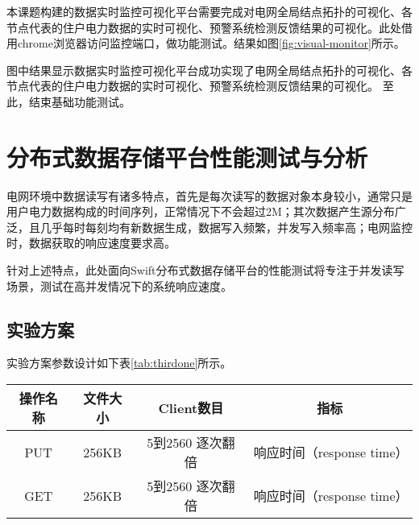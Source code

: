 本课题构建的数据实时监控可视化平台需要完成对电网全局结点拓扑的可视化、各节点代表的住户电力数据的实时可视化、预警系统检测反馈结果的可视化。此处借用chrome浏览器访问监控端口，做功能测试。结果如图\ref{fig:visual-monitor}所示。

\begin{figure}[!htp]
  \centering
  \hspace{1in}
  \hspace{1in}
  \hspace{1in}
\end{figure}

图中结果显示数据实时监控可视化平台成功实现了电网全局结点拓扑的可视化、各节点代表的住户电力数据的实时可视化、预警系统检测反馈结果的可视化。
至此，结束基础功能测试。

\section{分布式数据存储平台性能测试与分析}

电网环境中数据读写有诸多特点，首先是每次读写的数据对象本身较小，通常只是用户电力数据构成的时间序列，正常情况下不会超过2M；其次数据产生源分布广泛，且几乎每时每刻均有新数据生成，数据写入频繁，并发写入频率高；电网监控时，数据获取的响应速度要求高。

针对上述特点，此处面向Swift分布式数据存储平台的性能测试将专注于并发读写场景，测试在高并发情况下的系统响应速度。

\subsection{实验方案}

实验方案参数设计如下表\ref{tab:thirdone}所示。

\begin{table}[!hpb]
  \centering
  \begin{tabular}{|c|c|c|c|}
  \hline
  操作名称 & 文件大小 & Client数目 & 指标\\
  \hline
  PUT & 256KB & 5到2560 逐次翻倍 & 响应时间（response time）\\
  \hline
  GET & 256KB & 5到2560 逐次翻倍 & 响应时间（response time）\\
  \hline
  \end{tabular}
\end{table}

